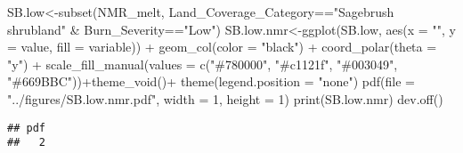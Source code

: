 \documentclass[
]{article}
\newenvironment{Shaded}{\begin{snugshade}}{\end{snugshade}}
\newcommand{\AttributeTok}[1]{\textcolor[rgb]{0.77,0.63,0.00}{#1}}
\newcommand{\DecValTok}[1]{\textcolor[rgb]{0.00,0.00,0.81}{#1}}
\newcommand{\FunctionTok}[1]{\textcolor[rgb]{0.00,0.00,0.00}{#1}}
\newcommand{\NormalTok}[1]{#1}
\newcommand{\OtherTok}[1]{\textcolor[rgb]{0.56,0.35,0.01}{#1}}
\newcommand{\SpecialCharTok}[1]{\textcolor[rgb]{0.00,0.00,0.00}{#1}}
\newcommand{\StringTok}[1]{\textcolor[rgb]{0.31,0.60,0.02}{#1}}
\begin{document}
\begin{Shaded}
\begin{Highlighting}[]
\NormalTok{SB.low}\OtherTok{\textless{}{-}}\FunctionTok{subset}\NormalTok{(NMR\_melt, Land\_Coverage\_Category}\SpecialCharTok{==}\StringTok{"Sagebrush shrubland"} \SpecialCharTok{\&}\NormalTok{ Burn\_Severity}\SpecialCharTok{==}\StringTok{"Low"}\NormalTok{)}
\NormalTok{SB.low.nmr}\OtherTok{\textless{}{-}}\FunctionTok{ggplot}\NormalTok{(SB.low, }\FunctionTok{aes}\NormalTok{(}\AttributeTok{x =} \StringTok{""}\NormalTok{, }\AttributeTok{y =}\NormalTok{ value, }\AttributeTok{fill =}\NormalTok{ variable)) }\SpecialCharTok{+}
    \FunctionTok{geom\_col}\NormalTok{(}\AttributeTok{color =} \StringTok{"black"}\NormalTok{) }\SpecialCharTok{+}
    \FunctionTok{coord\_polar}\NormalTok{(}\AttributeTok{theta =} \StringTok{"y"}\NormalTok{) }\SpecialCharTok{+} \FunctionTok{scale\_fill\_manual}\NormalTok{(}\AttributeTok{values =} \FunctionTok{c}\NormalTok{(}\StringTok{"\#780000"}\NormalTok{, }\StringTok{"\#c1121f"}\NormalTok{, }\StringTok{"\#003049"}\NormalTok{, }\StringTok{"\#669BBC"}\NormalTok{))}\SpecialCharTok{+}\FunctionTok{theme\_void}\NormalTok{()}\SpecialCharTok{+}
    \FunctionTok{theme}\NormalTok{(}\AttributeTok{legend.position =} \StringTok{"none"}\NormalTok{)}
\FunctionTok{pdf}\NormalTok{(}\AttributeTok{file =} \StringTok{"../figures/SB.low.nmr.pdf"}\NormalTok{, }\AttributeTok{width =} \DecValTok{1}\NormalTok{, }\AttributeTok{height =} \DecValTok{1}\NormalTok{) }
\FunctionTok{print}\NormalTok{(SB.low.nmr)}
\FunctionTok{dev.off}\NormalTok{()}
\end{Highlighting}
\end{Shaded}

\begin{verbatim}
## pdf 
##   2
\end{verbatim}
\end{document}
